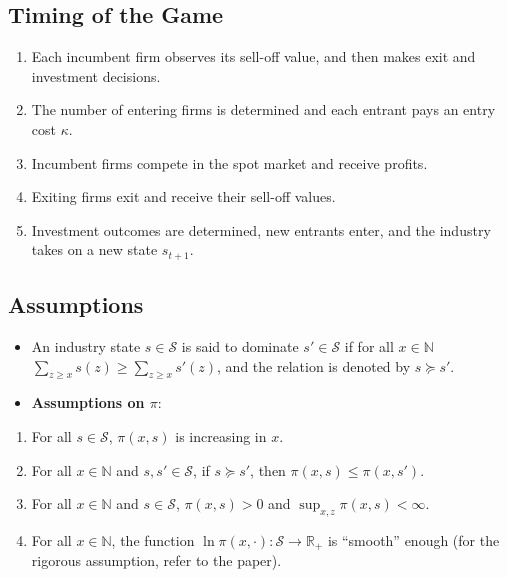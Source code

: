 \documentclass[]{book}
\providecommand{\tightlist}{%
  \setlength{\itemsep}{0pt}\setlength{\parskip}{0pt}}
\begin{document}
\subsection{Timing of the Game}\label{timing-of-the-game-1}

\begin{enumerate}
\def\labelenumi{\arabic{enumi}.}
\tightlist
\item
  Each incumbent firm observes its sell-off value, and then makes exit
  and investment decisions.
\item
  The number of entering firms is determined and each entrant pays an
  entry cost \(\kappa\).
\item
  Incumbent firms compete in the spot market and receive profits.
\item
  Exiting firms exit and receive their sell-off values.
\item
  Investment outcomes are determined, new entrants enter, and the
  industry takes on a new state \(s_{t + 1}\).
\end{enumerate}

\subsection{Assumptions}\label{assumptions}

\begin{itemize}
\tightlist
\item
  An industry state \(s \in \mathcal{S}\) is said to dominate
  \(s' \in \mathcal{S}\) if for all \(x \in \mathbb{N}\)
  \(\sum_{z \ge x} s(z) \ge \sum_{z \ge x} s'(z)\), and the relation is
  denoted by \(s \succeq s'\).
\item
  \textbf{Assumptions on \(\pi\)}:
\end{itemize}

\begin{enumerate}
\def\labelenumi{\arabic{enumi}.}
\tightlist
\item
  For all \(s \in \mathcal{S}\), \(\pi(x, s)\) is increasing in \(x\).
\item
  For all \(x \in \mathbb{N}\) and \(s, s' \in \mathcal{S}\), if
  \(s \succeq s'\), then \(\pi(x, s) \le \pi(x, s')\).
\item
  For all \(x \in \mathbb{N}\) and \(s \in \mathcal{S}\),
  \(\pi(x, s) > 0\) and \(\sup_{x, z} \pi(x, s) < \infty\).
\item
  For all \(x \in \mathbb{N}\), the function
  \(\ln \pi(x, \cdot): \mathcal{S} \to \mathbb{R}_+\) is ``smooth''
  enough (for the rigorous assumption, refer to the paper).
\end{enumerate}
\end{document}
